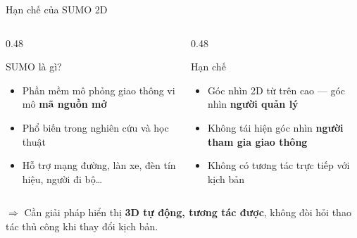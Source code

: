 \documentclass[t, aspectratio=169]{beamer} %
\begin{document}
	\begin{frame}{Hạn chế của SUMO 2D}
		\begin{columns}[T]
			\begin{column}{0.48\textwidth}
				\begin{block}{SUMO là gì?}
					\begin{itemize}
						\item Phần mềm mô phỏng giao thông vi mô \textbf{mã nguồn mở}
						\item Phổ biến trong nghiên cứu và học thuật
						\item Hỗ trợ mạng đường, làn xe, đèn tín hiệu, người đi bộ\ldots
					\end{itemize}
				\end{block}
			\end{column}
			\begin{column}{0.48\textwidth}
				\begin{alertblock}{Hạn chế}
					\begin{itemize}
						\item Góc nhìn 2D từ trên cao --- góc nhìn \textbf{người quản lý}
						\item Không tái hiện góc nhìn \textbf{người tham gia giao thông}
						\item Không có tương tác trực tiếp với kịch bản
					\end{itemize}
				\end{alertblock}
			\end{column}
		\end{columns}

		\vspace{0.6em}
		$\Rightarrow$ Cần giải pháp hiển thị \textbf{3D tự động, tương tác được}, không đòi hỏi thao tác thủ công khi thay đổi kịch bản.
	\end{frame}
\end{document}

